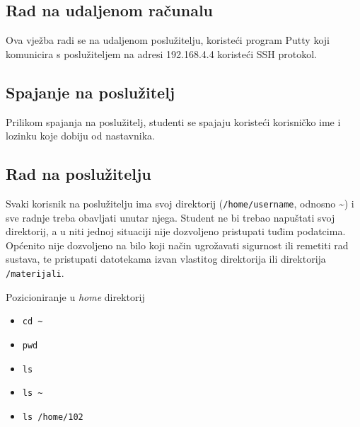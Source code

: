 
\subsection*{Rad na udaljenom računalu}

Ova vježba radi se na udaljenom poslužitelju, koristeći program Putty koji komunicira s poslužiteljem na adresi 192.168.4.4 koristeći SSH protokol.

\subsection*{Spajanje na poslužitelj}
Prilikom spajanja na poslužitelj, studenti se spajaju koristeći korisničko ime i lozinku koje dobiju od nastavnika. 

\subsection*{Rad na poslužitelju}
Svaki korisnik na poslužitelju ima svoj direktorij (\texttt{/home/username}, odnosno \textasciitilde) i sve radnje treba obavljati unutar njega. Student ne bi trebao napuštati svoj direktorij, a u niti jednoj situaciji nije dozvoljeno pristupati tuđim podatcima. Općenito nije dozvoljeno na bilo koji način ugrožavati sigurnost ili remetiti rad sustava, te pristupati datotekama izvan vlastitog direktorija ili direktorija \texttt{/materijali}.

\begin{primjer}
	Pozicioniranje u \textit{home} direktorij
	\begin{itemize}
		\item \lstinline!cd ~!
		\item \lstinline!pwd!
		\item \lstinline!ls!
		\item \lstinline!ls ~!
		\item \lstinline!ls /home/102! 
	\end{itemize}
\end{primjer}

